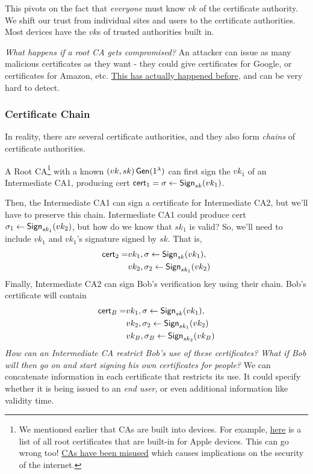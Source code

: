 This pivots on the fact that \emph{everyone} must know $vk$ of the certificate authority. We shift our trust from individual sites and users to the certificate authorities. Most devices have the $vk$s of trusted authorities built in. 

\emph{What happens if a root CA gets compromised?} An attacker can issue as many malicious certificates as they want - they could give certificates for Google, or certificates for Amazon, etc. \href{https://en.wikipedia.org/wiki/DigiNotar}{This has actually happened before}, and can be very hard to detect.

\subsubsection{Certificate Chain}
In reality, there are several certificate authorities, and they also form \emph{chains} of certificate authorities.


A Root CA\footnote{We mentioned earlier that CAs are built into devices. For example, \href{https://support.apple.com/en-us/HT213464}{here} is a list of all root certificates that are built-in for Apple devices. This can go wrong too! \href{https://en.wikipedia.org/wiki/Root_certificate\#Incidents_of_root_certificate_misuse}{CAs have been misused} which causes implications on the security of the internet.} with a known $(vk, sk)\operatorname{\mathsf{Gen}}(1^\lambda)$ can first sign the $vk_1$ of an Intermediate CA1, producing cert $\mathsf{cert}_1 = \sigma \leftarrow \operatorname{\mathsf{Sign}}_{sk}(vk_1)$.

Then, the Intermediate CA1 can sign a certificate for Intermediate CA2, but we'll have to preserve this chain. Intermediate CA1 could produce cert $\sigma_1\leftarrow\operatorname{\mathsf{Sign}}_{sk_1}(vk_2)$, but how do we know that $sk_1$ is valid? So, we'll need to include $vk_1$ and $vk_1$'s signature signed by $sk$. That is,
\begin{align*}
    \mathsf{cert}_2 = & vk_1, \sigma \leftarrow \operatorname{\mathsf{Sign}}_{sk}(vk_1),   \\
                      & vk_2, \sigma_2\leftarrow \operatorname{\mathsf{Sign}}_{sk_1}(vk_2)
\end{align*}
Finally, Intermediate CA2 can sign Bob's verification key using their chain. Bob's certificate will contain
\begin{align*}
    \mathsf{cert}_B = & vk_1, \sigma \leftarrow \operatorname{\mathsf{Sign}}_{sk}(vk_1),   \\
                      & vk_2, \sigma_2\leftarrow \operatorname{\mathsf{Sign}}_{sk_1}(vk_2) \\
                      & vk_B, \sigma_B\leftarrow \operatorname{\mathsf{Sign}}_{sk_2}(vk_B)
\end{align*}
\emph{How can an Intermediate CA restrict Bob's use of these certificates? What if Bob will then go on and start signing his own certificates for people?} We can concatenate information in each certificate that restricts its use. It could specify whether it is being issued to an \emph{end user}, or even additional information like validity time.

